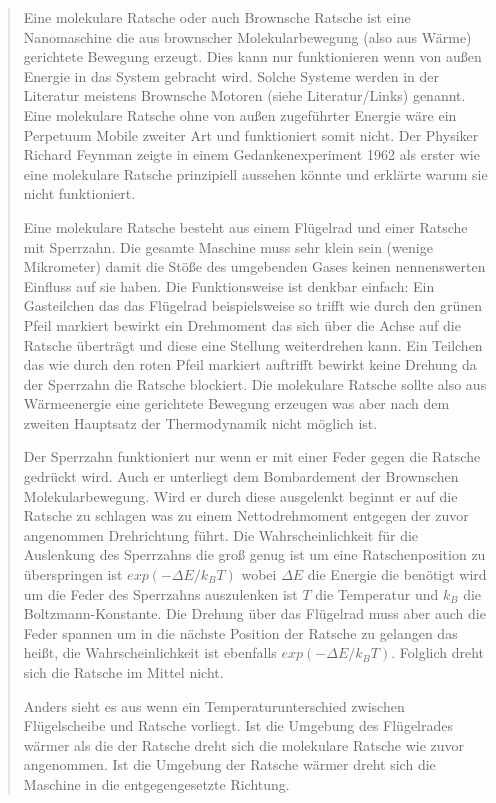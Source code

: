\begin{quote}
\small
Eine molekulare Ratsche oder auch Brownsche Ratsche ist eine Nanomaschine die aus brownscher Molekularbewegung (also aus Wärme) gerichtete Bewegung erzeugt.
Dies kann nur funktionieren wenn von außen Energie in das System gebracht wird.
Solche Systeme werden in der Literatur meistens Brownsche Motoren (siehe Literatur/Links) genannt.
Eine molekulare Ratsche ohne von außen zugeführter Energie wäre ein Perpetuum Mobile zweiter Art und funktioniert somit nicht.
Der Physiker Richard Feynman zeigte in einem Gedankenexperiment 1962 als erster wie eine molekulare Ratsche prinzipiell aussehen könnte und erklärte warum sie nicht funktioniert.

Eine molekulare Ratsche besteht aus einem Flügelrad und einer Ratsche mit Sperrzahn.
Die gesamte Maschine muss sehr klein sein (wenige Mikrometer) damit die Stöße des umgebenden Gases keinen nennenswerten Einfluss auf sie haben.
Die Funktionsweise ist denkbar einfach:
Ein Gasteilchen das das Flügelrad beispielsweise so trifft wie durch den grünen Pfeil markiert bewirkt ein Drehmoment das sich über die Achse auf die Ratsche überträgt und diese eine Stellung weiterdrehen kann.
Ein Teilchen das wie durch den roten Pfeil markiert auftrifft bewirkt keine Drehung da der Sperrzahn die Ratsche blockiert.
Die molekulare Ratsche sollte also aus Wärmeenergie eine gerichtete Bewegung erzeugen was aber nach dem zweiten Hauptsatz der Thermodynamik nicht möglich ist.

Der Sperrzahn funktioniert nur wenn er mit einer Feder gegen die Ratsche gedrückt wird.
Auch er unterliegt dem Bombardement der Brownschen Molekularbewegung.
Wird er durch diese ausgelenkt beginnt er auf die Ratsche zu schlagen was zu einem Nettodrehmoment entgegen der zuvor angenommen Drehrichtung führt.
Die Wahrscheinlichkeit für die Auslenkung des Sperrzahns die groß genug ist um eine Ratschenposition zu überspringen ist $exp(-\Delta E/k_BT)$ wobei $\Delta E$ die Energie die benötigt wird um die Feder des Sperrzahns auszulenken ist $T$ die Temperatur und $k_B$ die Boltzmann-Konstante.
Die Drehung über das Flügelrad muss aber auch die Feder spannen um in die nächste Position der Ratsche zu gelangen das heißt, die Wahrscheinlichkeit ist ebenfalls $exp(-\Delta E/k_BT)$.
Folglich dreht sich die Ratsche im Mittel nicht.

Anders sieht es aus wenn ein Temperaturunterschied zwischen Flügelscheibe und Ratsche vorliegt.
Ist die Umgebung des Flügelrades wärmer als die der Ratsche dreht sich die molekulare Ratsche wie zuvor angenommen.
Ist die Umgebung der Ratsche wärmer dreht sich die Maschine in die entgegengesetzte Richtung.

\end{quote}

